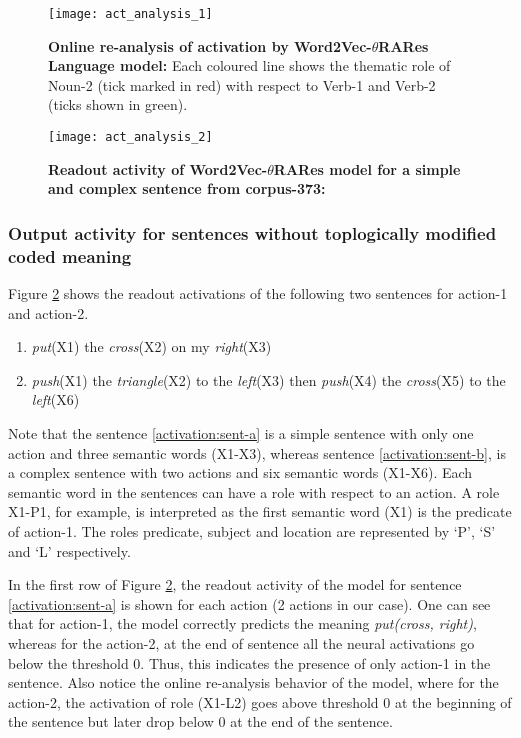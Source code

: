 \begin{figure}[hbtp]
\centering
\texttt{[image: act\_analysis\_1]}
\caption[Online re-analysis of activation by Word2Vec-$\theta$RARes Language model:]{\textbf{Online re-analysis of activation by Word2Vec-$\theta$RARes Language model:} Each coloured line shows the thematic role of Noun-2 (tick marked in red) with respect to Verb-1 and Verb-2 (ticks shown in green).}
\label{fig:act_analysis_1}
\end{figure}

\begin{figure}[hbtp]
\centering
\texttt{[image: act\_analysis\_2]}
\caption[Readout activity of Word2Vec-$\theta$RARes model for a simple and complex sentence from corpus-373]{\textbf{Readout activity of Word2Vec-$\theta$RARes model for a simple and complex sentence from corpus-373:} }
\label{fig:act_analysis_2}
\end{figure}

\subsubsection{Output activity for sentences without toplogically modified coded meaning} 

Figure \ref{fig:act_analysis_2} shows the readout activations of the following two sentences for action-1 and action-2. 

\begin{enumerate}[noitemsep,label=(\Alph*) ]
\item \textit{put}(X1) the \textit{cross}(X2) on my \textit{right}(X3) \label{activation:sent-a}
\item \textit{push}(X1) the \textit{triangle}(X2) to the \textit{left}(X3) then \textit{push}(X4) the \textit{cross}(X5) to the \textit{left}(X6) \label{activation:sent-b}
\end{enumerate}

Note that the sentence \ref{activation:sent-a} is a simple sentence with only one action and three semantic words (X1-X3), whereas sentence \ref{activation:sent-b}, is a complex sentence with two actions and six semantic words (X1-X6). Each semantic word in the sentences can have a role with respect to an action. A role X1-P1, for example, is interpreted as the first semantic word (X1)  is the predicate of action-1. The roles predicate, subject and location are represented by `P', `S' and `L' respectively.

In the first row of Figure \ref{fig:act_analysis_2}, the readout activity of the model for sentence \ref{activation:sent-a} is shown for each action (2 actions in our case). One can see that for action-1, the model correctly predicts the meaning \textit{put(cross, right)}, whereas for the action-2, at the end of sentence all the neural activations go below the threshold 0. Thus, this indicates the presence of only action-1 in the sentence. Also notice the online re-analysis behavior of the model, where for the action-2, the activation of role (X1-L2) goes above threshold 0 at the beginning of the sentence but later drop below 0 at the end of the sentence.

